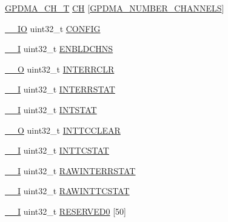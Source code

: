 \begin{DoxyCompactItemize}
\item 
\hyperlink{structGPDMA__CH__T}{G\+P\+D\+M\+A\+\_\+\+C\+H\+\_\+T} \hyperlink{structLPC__GPDMA__T_ab6b2ec077df490e64b10e7cb2bfeee10}{CH} \mbox{[}\hyperlink{group__GPDMA__17XX__40XX_gaf7c43b3d13c91c30ddf67e479966d5cd}{G\+P\+D\+M\+A\+\_\+\+N\+U\+M\+B\+E\+R\+\_\+\+C\+H\+A\+N\+N\+E\+LS}\mbox{]}
\item 
\hyperlink{core__cm3_8h_aec43007d9998a0a0e01faede4133d6be}{\+\_\+\+\_\+\+IO} uint32\+\_\+t \hyperlink{structLPC__GPDMA__T_a059b4997225adef9a773dca681a4b676}{C\+O\+N\+F\+IG}
\item 
\hyperlink{core__cm3_8h_af63697ed9952cc71e1225efe205f6cd3}{\+\_\+\+\_\+I} uint32\+\_\+t \hyperlink{structLPC__GPDMA__T_aa35d28a63f29b0e098d8e40dc294049a}{E\+N\+B\+L\+D\+C\+H\+NS}
\item 
\hyperlink{core__cm3_8h_a7e25d9380f9ef903923964322e71f2f6}{\+\_\+\+\_\+O} uint32\+\_\+t \hyperlink{structLPC__GPDMA__T_ae278f6d236ca389e9aa9a8bcd68ba063}{I\+N\+T\+E\+R\+R\+C\+LR}
\item 
\hyperlink{core__cm3_8h_af63697ed9952cc71e1225efe205f6cd3}{\+\_\+\+\_\+I} uint32\+\_\+t \hyperlink{structLPC__GPDMA__T_a6d563f8fa43b98a42090d51698735727}{I\+N\+T\+E\+R\+R\+S\+T\+AT}
\item 
\hyperlink{core__cm3_8h_af63697ed9952cc71e1225efe205f6cd3}{\+\_\+\+\_\+I} uint32\+\_\+t \hyperlink{structLPC__GPDMA__T_a744123eb8ee989a3c80570160cd0b91b}{I\+N\+T\+S\+T\+AT}
\item 
\hyperlink{core__cm3_8h_a7e25d9380f9ef903923964322e71f2f6}{\+\_\+\+\_\+O} uint32\+\_\+t \hyperlink{structLPC__GPDMA__T_a85a79ad19b52d9017a2fd7b15349a168}{I\+N\+T\+T\+C\+C\+L\+E\+AR}
\item 
\hyperlink{core__cm3_8h_af63697ed9952cc71e1225efe205f6cd3}{\+\_\+\+\_\+I} uint32\+\_\+t \hyperlink{structLPC__GPDMA__T_a2ca8f15773342988a28ba333cf73c380}{I\+N\+T\+T\+C\+S\+T\+AT}
\item 
\hyperlink{core__cm3_8h_af63697ed9952cc71e1225efe205f6cd3}{\+\_\+\+\_\+I} uint32\+\_\+t \hyperlink{structLPC__GPDMA__T_ae4bf6971c867a0892da2cf449c341122}{R\+A\+W\+I\+N\+T\+E\+R\+R\+S\+T\+AT}
\item 
\hyperlink{core__cm3_8h_af63697ed9952cc71e1225efe205f6cd3}{\+\_\+\+\_\+I} uint32\+\_\+t \hyperlink{structLPC__GPDMA__T_a215d6f79819ceb03fd00ecae1324a7c8}{R\+A\+W\+I\+N\+T\+T\+C\+S\+T\+AT}
\item 
\hyperlink{core__cm3_8h_af63697ed9952cc71e1225efe205f6cd3}{\+\_\+\+\_\+I} uint32\+\_\+t \hyperlink{structLPC__GPDMA__T_aa500686787db277559756be8d486c0c2}{R\+E\+S\+E\+R\+V\+E\+D0} \mbox{[}50\mbox{]}

\end{DoxyCompactItemize}
